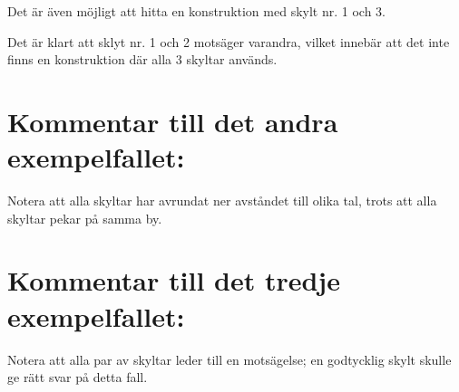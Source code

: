 Det är även möjligt att hitta en konstruktion med skylt nr. 1 och 3.

Det är klart att sklyt nr. 1 och 2 motsäger varandra, vilket innebär att det inte finns en konstruktion där alla 3 skyltar används.

\section*{Kommentar till det andra exempelfallet:}
Notera att alla skyltar har avrundat ner avståndet till olika tal, trots att alla skyltar pekar på samma by.

\section*{Kommentar till det tredje exempelfallet:}
Notera att alla par av skyltar leder till en motsägelse; en godtycklig skylt skulle ge rätt svar på detta fall.
